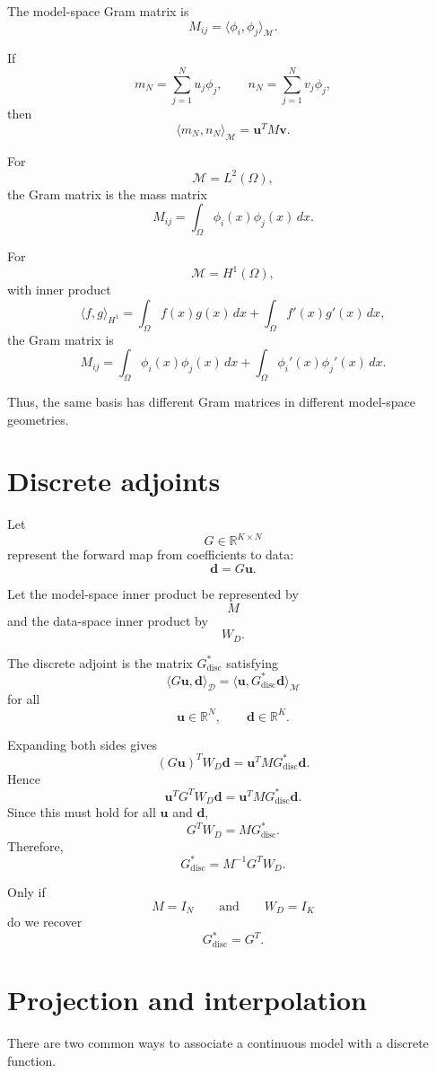 \documentclass[11pt,a4paper]{book}
\newcommand{\M}{\mathcal{M}}      %
\newcommand{\D}{\mathcal{D}}      %
\newcommand{\R}{\mathbb{R}}
\begin{document}
The model-space Gram matrix is
\[
    M_{ij}
    =
    \langle \phi_i,\phi_j\rangle_{\M}.
\]

If
\[
    m_N=\sum_{j=1}^N u_j\phi_j,
    \qquad
    n_N=\sum_{j=1}^N v_j\phi_j,
\]
then
\[
    \langle m_N,n_N\rangle_{\M}
    =
    \bm{u}^T M\bm{v}.
\]

For
\[
    \M=L^2(\Omega),
\]
the Gram matrix is the mass matrix
\[
    M_{ij}
    =
    \int_\Omega \phi_i(x)\phi_j(x)\,dx.
\]

For
\[
    \M=H^1(\Omega),
\]
with inner product
\[
    \langle f,g\rangle_{H^1}
    =
    \int_\Omega f(x)g(x)\,dx
    +
    \int_\Omega f'(x)g'(x)\,dx,
\]
the Gram matrix is
\[
    M_{ij}
    =
    \int_\Omega \phi_i(x)\phi_j(x)\,dx
    +
    \int_\Omega \phi_i'(x)\phi_j'(x)\,dx.
\]

Thus, the same basis has different Gram matrices in different model-space
geometries.

\section{Discrete adjoints}

Let
\[
    G\in\R^{K\times N}
\]
represent the forward map from coefficients to data:
\[
    \bm{d}=G\bm{u}.
\]

Let the model-space inner product be represented by
\[
    M
\]
and the data-space inner product by
\[
    W_D.
\]

The discrete adjoint is the matrix $G^\ast_{\mathrm{disc}}$ satisfying
\[
    \langle G\bm{u},\bm{d}\rangle_{\D}
    =
    \langle \bm{u},G^\ast_{\mathrm{disc}}\bm{d}\rangle_{\M}
\]
for all
\[
    \bm{u}\in\R^N,
    \qquad
    \bm{d}\in\R^K.
\]

Expanding both sides gives
\[
    (G\bm{u})^T W_D\bm{d}
    =
    \bm{u}^T M G^\ast_{\mathrm{disc}}\bm{d}.
\]
Hence
\[
    \bm{u}^T G^TW_D\bm{d}
    =
    \bm{u}^T M G^\ast_{\mathrm{disc}}\bm{d}.
\]
Since this must hold for all $\bm{u}$ and $\bm{d}$,
\[
    G^TW_D
    =
    M G^\ast_{\mathrm{disc}}.
\]
Therefore,
\[
    G^\ast_{\mathrm{disc}}
    =
    M^{-1}G^T W_D.
\]

Only if
\[
    M=I_N
    \qquad
    \text{and}
    \qquad
    W_D=I_K
\]
do we recover
\[
    G^\ast_{\mathrm{disc}}=G^T.
\]

\section{Projection and interpolation}

There are two common ways to associate a continuous model with a discrete
function.
\end{document}
